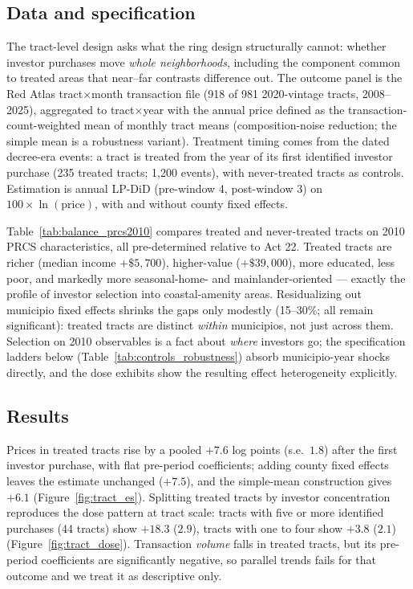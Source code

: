 \documentclass[11pt]{article}
\begin{document}
\subsection{Data and specification}

The tract-level design asks what the ring design structurally cannot: whether
investor purchases move \emph{whole neighborhoods}, including the component
common to treated areas that near--far contrasts difference out. The outcome
panel is the Red Atlas tract$\times$month transaction file (918 of 981
2020-vintage tracts, 2008--2025), aggregated to tract$\times$year with the
annual price defined as the transaction-count-weighted mean of monthly tract
means (composition-noise reduction; the simple mean is a robustness
variant). Treatment timing comes from the dated decree-era events: a tract is
treated from the year of its first identified investor purchase (235 treated
tracts; 1{,}200 events), with never-treated tracts as controls. Estimation is
annual LP-DiD (pre-window 4, post-window 3) on $100 \times \ln(\text{price})$,
with and without county fixed effects.

Table~\ref{tab:balance_prcs2010} compares treated and never-treated tracts
on 2010 PRCS characteristics, all pre-determined relative to Act 22.
Treated tracts are richer (median income $+\$5{,}700$), higher-value
($+\$39{,}000$), more educated, less poor, and markedly more seasonal-home-
and mainlander-oriented --- exactly the profile of investor selection into
coastal-amenity areas. Residualizing out municipio fixed effects shrinks
the gaps only modestly (15--30\%; all remain significant): treated tracts
are distinct \emph{within} municipios, not just across them. Selection on
2010 observables is a fact about \emph{where} investors go; the
specification ladders below (Table~\ref{tab:controls_robustness}) absorb
municipio-year shocks directly, and the dose exhibits show the resulting
effect heterogeneity explicitly.



\subsection{Results}

Prices in treated tracts rise by a pooled $+7.6$ log points
(s.e.\ $1.8$) after the first investor purchase, with flat pre-period
coefficients; adding county fixed effects leaves the estimate unchanged
($+7.5$), and the simple-mean construction gives $+6.1$
(Figure~\ref{fig:tract_es}). Splitting treated tracts by investor
concentration reproduces the dose pattern at tract scale: tracts with five or
more identified purchases (44 tracts) show $+18.3$ ($2.9$), tracts with one
to four show $+3.8$ ($2.1$) (Figure~\ref{fig:tract_dose}). Transaction
\emph{volume} falls in treated tracts, but its pre-period coefficients are
significantly negative, so parallel trends fails for that outcome and we
treat it as descriptive only.
\end{document}
